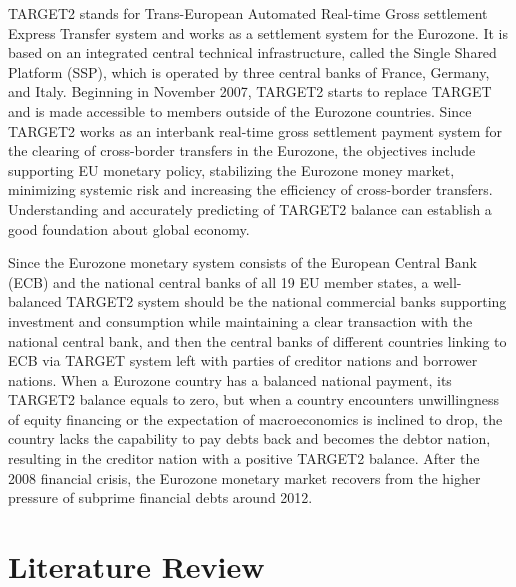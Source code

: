 \documentclass[12pt]{article}
\begin{document}
TARGET2 stands for Trans-European Automated Real-time Gross settlement Express Transfer system and works as a settlement system for the Eurozone. It is based on an integrated central technical infrastructure, called the Single Shared Platform (SSP), which is operated by three central banks of France, Germany, and Italy. Beginning in November 2007, TARGET2 starts to replace TARGET and is made accessible to members outside of the Eurozone countries. Since TARGET2 works as an interbank real-time gross settlement payment system for the clearing of cross-border transfers in the Eurozone, the objectives include supporting EU monetary policy, stabilizing the Eurozone money market, minimizing systemic risk and increasing the efficiency of cross-border transfers. Understanding and accurately predicting of TARGET2 balance can establish a good foundation about global economy. 

Since the Eurozone monetary system consists of the European Central Bank (ECB) and the national central banks of all 19 EU member states, a well-balanced TARGET2 system should be the national commercial banks supporting investment and consumption while maintaining a clear transaction with the national central bank, and then the central banks of different countries linking to ECB via TARGET system left with parties of creditor nations and borrower nations. When a Eurozone country has a balanced national payment, its TARGET2 balance equals to zero, but when a country encounters unwillingness of equity financing or the expectation of macroeconomics is inclined to drop, the country lacks the capability to pay debts back and becomes the debtor nation, resulting in the creditor nation with a positive TARGET2 balance. After the 2008 financial crisis, the Eurozone monetary market recovers from the higher pressure of subprime financial debts around 2012. 

\section{Literature Review} \label{sec:literature}
\end{document}
